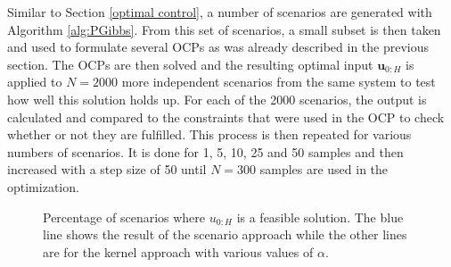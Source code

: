 Similar to Section \ref{optimal control}, a number of scenarios are generated with Algorithm \ref{alg:PGibbs}. From this set of scenarios, a small subset is then taken and used to formulate several OCPs as was already described in the previous section. The OCPs are then solved and the resulting optimal input $\boldsymbol{u}_{0:H}$ is applied to $N = 2000$ more independent scenarios from the same system to test how well this solution holds up. For each of the 2000 scenarios, the output is calculated and compared to the constraints that were used in the OCP to check whether or not they are fulfilled. This process is then repeated for various numbers of scenarios. It is done for 1, 5, 10, 25 and 50 samples and then increased with a step size of 50 until $N = 300$ samples are used in the optimization.

\begin{figure}[t!]
		\def\file{data/AlphaTest_K300_MaxConstraint_S2.txt}
		
		\centering
		\vspace*{-0.4cm}
		
		\caption{Percentage of scenarios where $u_{0:H}$ is a feasible solution. The blue line shows the result of the scenario approach while the other lines are for the kernel approach with various values of $\alpha$.}
		\label{fig:robustness_plot}
\end{figure}


